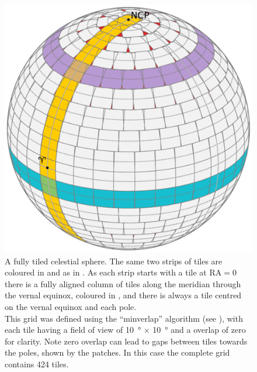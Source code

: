 \begin{colsection}
\begin{colsection}
\begin{figure}[t]
    \begin{center}
        \includegraphics[width=\linewidth]{images/globe4.pdf}
    \end{center}
    \caption[A fully tiled celestial sphere]{
        A fully tiled celestial sphere. The same two strips of tiles are coloured in  and  as in . As each strip starts with a tile at RA$=0$ there is a fully aligned column of tiles along the meridian through the vernal equinox, coloured in , and there is always a tile centred on the vernal equinox and each pole. \\
        This grid was defined using the ``minverlap'' algorithm (see ), with each tile having a field of view of \SI{10}{\degree} $\times$ \SI{10}{\degree} and a overlap of zero for clarity. Note zero overlap can lead to gaps between tiles towards the poles, shown by the  patches. In this case the complete grid contains 424 tiles.
    }\label{fig:tiledsphere}
\end{figure}

\clearpage

\makeatletter
\setlength{\@fptop}{0\p@ \@plus 1fil} %
\makeatother


\end{colsection}
\end{colsection}
